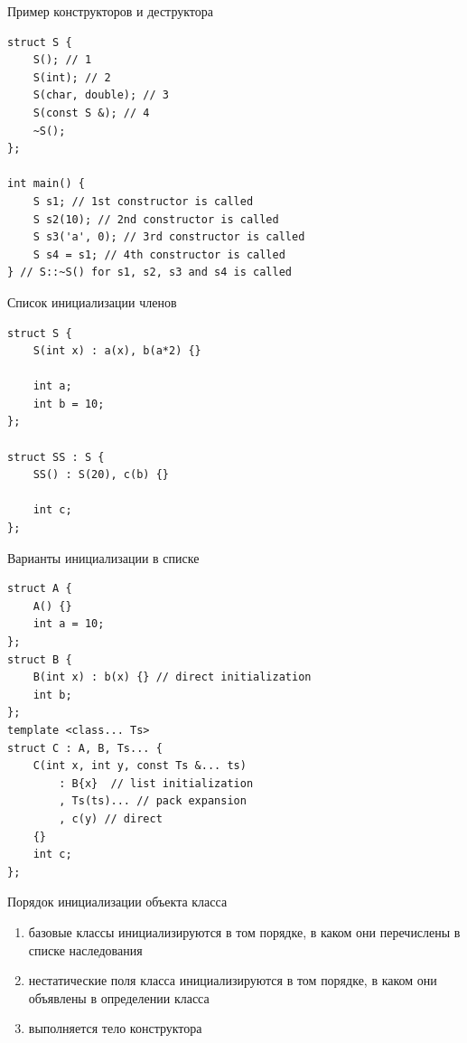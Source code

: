\documentclass[unknownkeysallowed,xcolor=table]{beamer}
\begin{document}
\begin{frame}[fragile]{Пример конструкторов и деструктора}
\begin{lstlisting}
struct S {
    S(); // 1
    S(int); // 2
    S(char, double); // 3
    S(const S &); // 4
    ~S();
};

int main() {
    S s1; // 1st constructor is called
    S s2(10); // 2nd constructor is called
    S s3('a', 0); // 3rd constructor is called
    S s4 = s1; // 4th constructor is called
} // S::~S() for s1, s2, s3 and s4 is called
\end{lstlisting}
\end{frame}

\begin{frame}[fragile]{Список инициализации членов}
\begin{lstlisting}
struct S {
    S(int x) : a(x), b(a*2) {}
    
    int a;
    int b = 10;
};

struct SS : S {
    SS() : S(20), c(b) {}
    
    int c;
};
\end{lstlisting}
\end{frame}

\begin{frame}[fragile]{Варианты инициализации в списке}
\begin{lstlisting}
struct A {
    A() {}
    int a = 10;
};
struct B {
    B(int x) : b(x) {} // direct initialization
    int b;
};
template <class... Ts>
struct C : A, B, Ts... {
    C(int x, int y, const Ts &... ts)
        : B{x}  // list initialization
        , Ts(ts)... // pack expansion
        , c(y) // direct
    {}
    int c;
};
\end{lstlisting}
\end{frame}

\begin{frame}{Порядок инициализации объекта класса}
\begin{enumerate}
  \item базовые классы инициализируются в том порядке, в каком они перечислены в списке наследования \vspace{1em}
  \item нестатические поля класса инициализируются в том порядке, в каком они объявлены в определении класса \vspace{1em}
  \item выполняется тело конструктора
\end{enumerate}
\end{frame}
\end{document}
